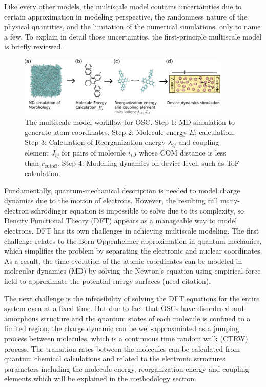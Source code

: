 \documentclass[%
 reprint,
 amsmath,amssymb,
 aps,
]{revtex4-2}
\begin{document}
Like every other models, the multiscale model contains uncertainties due to certain approximation in modeling perspective, the randomness nature of the physical quantities, and the limitation of the numerical simulations, only to name a few.
To explain in detail those uncertainties, the first-principle multiscale model is briefly reviewed. 

\begin{figure}
  \centering
  \includegraphics[width=0.9\textwidth]{figs/MSM.pdf}
  \caption{The multiscale model workflow for OSC. Step 1: MD simulation to generate atom coordinates. Step 2: Molecule energy $E_i$ calculation. Step 3: Calculation of Reorganization energy $\lambda_{ij}$ and coupling element $J_{ij}$ for pairs of molecule $i,j$ whose COM distance is less than $r_\text{cutoff}$. Step 4: Modelling dynamics on device level, such as ToF calculation.}
  \label{fig:MSM}
\end{figure}

Fundamentally, quantum-mechanical description is needed to model charge dynamics due to the motion of electrons. However, the resulting full many-electron schr\"{o}dinger equation is impossible to solve due to its complexity, so Density Functional Theory (DFT) appears as a manageable way to model electrons.
DFT has its own challenges in achieving multiscale modeling.
The first challenge relates to the Born-Oppenheimer approximation in quantum
mechanics, which simplifies the problem by separating the electronic and nuclear
coordinates. As a result, the time evolution of the atomic coordinates can be modeled in molecular dynamics (MD) by solving the Newton's equation using empirical force field to approximate the potential energy surfaces (need citation). 

The next challenge is the infeasibility of solving the DFT equations for the entire system even at a fixed time. 
But due to fact that OSCs have disordered and amorphous structure and the quantum states of each molecule is confined to a limited region, the charge dynamic can be well-approxmiated as a jumping process between molecules, which is a continuous time random walk (CTRW) process.
The transition rates between the molecules can be calculated from quantum chemical calculations and related to the electronic structures parameters including the molecule energy, reorganization energy and coupling elements which will be explained in the methodology section. 
\end{document}
